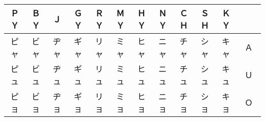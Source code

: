 \begin{center}
\begin{tabular}{|cccc|ccccccc|c|}
\hline
ＰＹ & ＢＹ & Ｊ   & ＧＹ & ＲＹ & ＭＹ & ＨＹ & ＮＹ & ＣＨ & ＳＨ & ＫＹ & 　　 \\\hline
ピャ & ビャ & ヂャ & ギャ & リャ & ミャ & ヒャ & ニャ & チャ & シャ & キャ & Ａ \\
ピュ & ビュ & ヂュ & ギュ & リュ & ミュ & ヒュ & ニュ & チュ & シュ & キュ & Ｕ \\
ピョ & ビョ & ヂョ & ギョ & リョ & ミョ & ヒョ & ニョ & チョ & ショ & キョ & Ｏ \\
\hline
\end{tabular}
\end{center}
